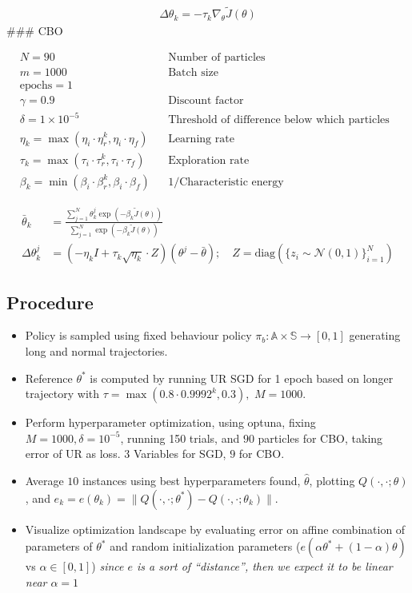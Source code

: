 \[
\begin{aligned}
\Delta\theta_k = -\tau_k \nabla_\theta \tilde J(\theta)
\end{aligned}
\] \#\#\# CBO

\[
\begin{aligned}
&N = 90 && \text{Number of particles}\\
&m = 1000 && \text{Batch size}\\
&\text{epochs} = 1 \\
&γ = 0.9 && \text{Discount factor}\\
&δ = 1\times 10^{-5} && \text{Threshold of difference below which particles take a brownian motion step}\\
&η_k = \max(\eta_i\cdot \eta_r^k,\eta_i\cdot \eta_f) && \text{Learning rate}\\
&τ_k =  \max(\tau_i\cdot \tau_r^k,\tau_i\cdot\tau_f) && \text{Exploration rate}\\
&β_k =  \min(\beta_i\cdot \beta_r^k,\beta_i\cdot \beta_f) && \text{1/Characteristic energy}
\end{aligned}
\]

\[
\begin{aligned}
\bar\theta_k &= \frac{\sum_{j=1}^N \theta_k^{j} \exp(-\beta_k\tilde J(\theta))}{\sum_{j=1}^N  \exp(-\beta_k\tilde J(\theta))}\\
\Delta \theta^{j}_k &= (-\eta_k I+\tau_k\sqrt{\eta_k}\cdot Z)(\theta^j-\bar\theta); \quad Z=\text{diag}(\{z_i\sim \mathcal N(0,1)\}_{i=1}^N)
\end{aligned}
\]

\hypertarget{procedure}{%
\subsection{Procedure}\label{procedure}}

\begin{itemize}
\item
  Policy is sampled using fixed behaviour policy
  \(\pi_b:\mathbb A\times \mathbb S\rightarrow[0,1]\) generating long
  and normal trajectories.
\item
  Reference \(\theta^*\) is computed by running UR SGD for 1 epoch based
  on longer trajectory with \(\tau=\max(0.8\cdot 0.9992^k, 0.3),\)
  \(M=1000\).
\item
  Perform hyperparameter optimization, using optuna, fixing
  \(M=1000, \delta = 10^{-5}\), running 150 trials, and \(90\) particles
  for CBO, taking error of UR as loss. \(3\) Variables for SGD, \(9\)
  for CBO.
\item
  Average \(10\) instances using best hyperparameters found,
  \(\hat\theta\), plotting \(Q(\cdot,\cdot;\theta)\), and
  \(e_k=e(\theta_k)=\|Q(\cdot, \cdot;\theta^*)-Q(\cdot, \cdot;\theta_k)\|\).
\item
  Visualize optimization landscape by evaluating error on affine
  combination of parameters of \(\theta^*\) and random initialization
  parameters (\(e(\alpha\theta^*+(1-\alpha)\theta)\) vs
  \(\alpha\in[0,1]\)) \emph{since \(e\) is a sort of ``distance'', then
  we expect it to be linear near \(\alpha=1\)}
\end{itemize}

